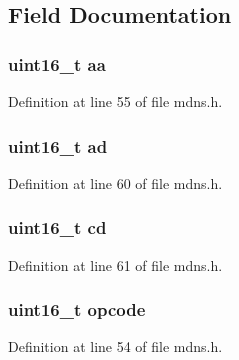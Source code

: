 \subsection{Field Documentation}
\hypertarget{structdns__flags__t_a303aecc788f498a5c21fe1d5c2ddf617}{
\subsubsection[{aa}]{\setlength{\rightskip}{0pt plus 5cm}uint16\-\_\-t aa}}\label{structdns__flags__t_a303aecc788f498a5c21fe1d5c2ddf617}


Definition at line 55 of file mdns.\-h.

\hypertarget{structdns__flags__t_ae44bc0444c0f86c5369f02f61a1f083a}{
\subsubsection[{ad}]{\setlength{\rightskip}{0pt plus 5cm}uint16\-\_\-t ad}}\label{structdns__flags__t_ae44bc0444c0f86c5369f02f61a1f083a}


Definition at line 60 of file mdns.\-h.

\hypertarget{structdns__flags__t_aaf00d4c86279d8c9bce3982afeecb7d5}{
\subsubsection[{cd}]{\setlength{\rightskip}{0pt plus 5cm}uint16\-\_\-t cd}}\label{structdns__flags__t_aaf00d4c86279d8c9bce3982afeecb7d5}


Definition at line 61 of file mdns.\-h.

\hypertarget{structdns__flags__t_aeb39438c0aa5ad494c96060b00351545}{
\subsubsection[{opcode}]{\setlength{\rightskip}{0pt plus 5cm}uint16\-\_\-t opcode}}\label{structdns__flags__t_aeb39438c0aa5ad494c96060b00351545}


Definition at line 54 of file mdns.\-h.

